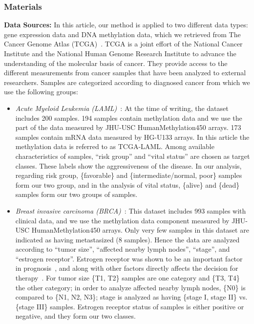 \subsubsection{Materials}
\textbf{Data Sources:}
In this article, our method is applied to two different data types: gene expression data and DNA methylation data, which we retrieved from The Cancer Genome Atlas (TCGA)~\cite{tcga-ref}. TCGA is a joint effort of the National Cancer Institute and the National Human Genome Research Institute to advance the understanding of the molecular basis of cancer. They provide access to the different measurements from cancer samples that have been analyzed to external researchers. 
Samples are categorized according to diagnosed cancer from which we use the following groups:

\begin{itemize}
\item \emph{Acute Myeloid Leukemia (LAML)}~\cite{laml2013}: At the time of writing, the dataset includes 200 samples. 194 samples contain methylation data and we use the part of the data measured by JHU-USC HumanMethylation450 arrays. 173 samples contain mRNA data measured by HG-U133 arrays. In this article the methylation data is referred to as TCGA-LAML. Among available characteristics of samples, ``risk group'' and ``vital status'' are chosen as target classes. These labels show the aggressiveness of the disease. 
In our analysis, regarding risk group, \{favorable\} and \{intermediate/normal, poor\} samples form our two group, and in the analysis of vital status, \{alive\} and \{dead\} samples form our two groups of samples.

\item \emph{Breast invasive carcinoma (BRCA)}~\cite{brca2012}: This dataset includes 993 samples with clinical data, and we use the methylation data component measured by JHU-USC HumanMethylation450 arrays. Only very few samples in this dataset are indicated as having metastasized (8 samples).
  Hence the data are analyzed according to ``tumor size'', ``affected nearby lymph nodes'', ``stage'', and ``estrogen receptor''. Estrogen receptor was shown to be an important factor in prognosis~\cite{knight1977estrogen}, and along with other factors directly affects the decision for therapy~\cite{goldhirsch2001meeting,national2001national}. For tumor size \{T1, T2\} samples are one category and \{T3, T4\} the other category; in order to analyze affected nearby lymph nodes, \{N0\} is compared to \{N1, N2, N3\}; stage is analyzed as having \{stage I, stage II\} vs. \{stage III\} samples. Estrogen receptor status of samples is either positive or negative, and they form our two classes.
\end{itemize}

